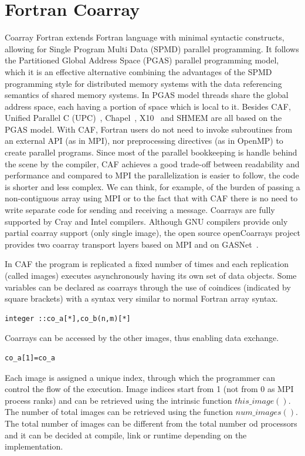 \documentclass{IOS-Book-Article}
\begin{document}
\section{Fortran Coarray}
Coarray Fortran extends Fortran language with minimal syntactic constructs, allowing for Single Program Multi Data (SPMD) parallel programming. 
It follows the Partitioned Global Address Space (PGAS) parallel programming model, which it is an effective alternative combining the advantages of the SPMD programming style for distributed memory systems with the data referencing semantics of shared memory systems. 
In PGAS model threads share the global address space, each having a portion of space which is local to it. 
Besides CAF, Unified Parallel C (UPC)~\cite{UPCSpec}, Chapel~\cite{chapel}, X10~\cite{Charles:2005} and SHMEM are all based on the PGAS model.
With CAF, Fortran users do not need to invoke subroutines from an  external API (as in MPI), nor preprocessing directives (as in OpenMP) to create parallel programs. 
Since most of the parallel bookkeeping is handle behind the scene by the compiler, CAF achieves a good trade-off between readability and performance and compared to MPI the parallelization is easier to follow, the code is shorter and less complex. We can think, for example, of the burden of passing a non-contiguous array using MPI   or to the fact that with CAF there is no need to write separate code for sending and receiving a message.
Coarrays are fully supported by Cray and Intel compilers. Although GNU compilers provide only partial coarray support  (only single image),  the open source openCoarrays project provides two coarray transport layers based on MPI and on GASNet~\cite{PGAS14}. 

In CAF the program is replicated a fixed number of times and each replication (called images) executes asynchronously having its own set of data objects. 
Some variables can be declared as coarrays through the use of coindices (indicated by square brackets) with a syntax very similar to normal Fortran array syntax. 
\begin{lstlisting}
integer ::co_a[*],co_b(n,m)[*]
\end{lstlisting}

Coarrays can be accessed by the other images, thus enabling data exchange. 

\begin{lstlisting}
co_a[1]=co_a
\end{lstlisting}

Each image is assigned a unique index, through which the programmer can control the flow of the execution. Image indices start from 1 (not from 0 as MPI process ranks) and can be retrieved using the intrinsic function $this\_image()$. The number of total images can be retrieved using the function $num\_images()$. The total number of images can be different from the total number od processors and it can be decided at compile, link or runtime depending on the implementation. 
\end{document}
